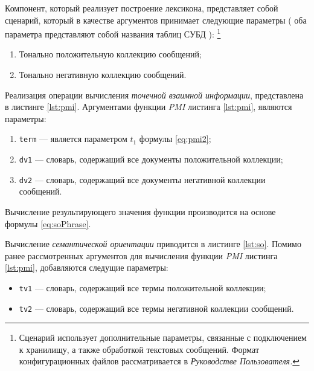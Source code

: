     Компонент, который реализует построение лексикона, представляет собой
    сценарий, который в качестве аргументов принимает следующие параметры
    (
        оба параметра представляют собой названия таблиц СУБД
    ):
    \footnote{Сценарий использует дополнительные параметры, связанные
    с подключением к хранилищу, а также обработкой текстовых сообщений.
    Формат конфигурационных файлов рассматривается в {\it Руководстве
    Пользователя.}}

    \begin{enumerate}
        \item Тонально положительную коллекцию сообщений;
        \item Тонально негативную коллекцию сообщений.
    \end{enumerate}

    Реализация операции вычисления {\it точечной взаимной информации},
    представлена в листинге \ref{lst:pmi}.
    Аргументами функции {\it PMI} листинга \ref{lst:pmi}, являются параметры:
    \begin{enumerate}
        \item {\tt term} --- является параметром $t_1$
            формулы \ref{eq:pmi2};
        \item {\tt dv1} --- словарь, содержащий все документы положительной коллекции;
        \item {\tt dv2} --- словарь, содержащий все документы негативной коллекции сообщений.
    \end{enumerate}

    Вычисление результирующего значения функции производится на основе формулы \ref{eq:soPhrase}.

    \lstset{style=python}
    

    Вычисление {\it семантической ориентации} приводится в листинге \ref{lst:so}.
    Помимо ранее рассмотренных аргументов для вычисления функции {\it PMI}
    листинга \ref{lst:pmi}, добавляются следущие параметры:
    \begin{itemize}
        \item {\tt tv1} --- словарь, содержащий все термы положительной коллекции;
        \item {\tt tv2} --- словарь, содержащий все термы негативной коллекции сообщений.
    \end{itemize}

